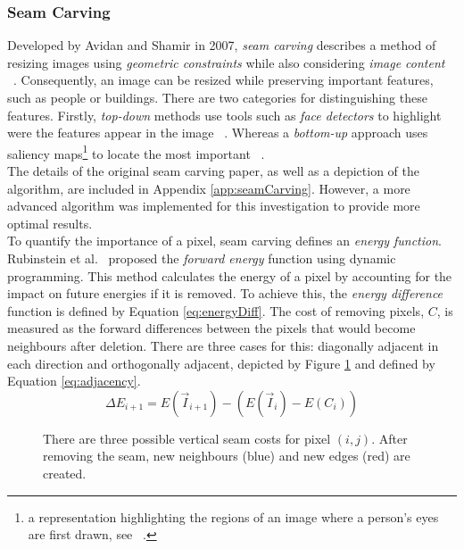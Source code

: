 \subsubsection{Seam Carving}
\label{sec:seamCarving}
\setlength{\leftskip}{0.5cm}
\indent \indent
Developed by Avidan and Shamir in 2007, \textit{seam carving} describes a method of resizing images using \textit{geometric constraints} while also considering \textit{image content} ~\cite{SeamCarving}. Consequently, an image can be resized while preserving important features, such as people or buildings. There are two categories for distinguishing these features. Firstly, \textit{top-down} methods use tools such as \textit{face detectors} to highlight were the features appear in the image ~\cite{Viola}. Whereas a \textit{bottom-up} approach uses saliency maps\footnote{a representation highlighting the regions of an image where a person's eyes are first drawn, see ~\cite{Saliency}.} to locate the most important ~\cite{Itti}.
\smallskip \\ \indent
The details of the original seam carving paper, as well as a depiction of the algorithm, are included in Appendix \ref{app:seamCarving}. However, a more advanced algorithm was implemented for this investigation to provide more optimal results.
\smallskip \\ \indent
To quantify the importance of a pixel, seam carving defines an \textit{energy function}. Rubinstein et al.\ \cite{Rubinstein} proposed the \textit{forward energy} function using dynamic programming. This method calculates the energy of a pixel by accounting for the impact on future energies if it is removed. To achieve this, the \textit{energy difference} function is defined by Equation \ref{eq:energyDiff}. The cost of removing pixels, $C$, is measured as the forward differences between the pixels that would become neighbours after deletion. There are three cases for this: diagonally adjacent in each direction and orthogonally adjacent, depicted by Figure \ref{fig:adjacency} and defined by Equation \ref{eq:adjacency}.
\begin{equation}
    \label{eq:energyDiff}
    \Delta E_{i+1} = E(\vec{I}_{i+1}) - (E(\vec{I}_i) - E(C_i))
\end{equation}
\begin{figure}
    \scalebox{0.78}{}
    \caption[Potential Seam Costs]{There are three possible vertical seam costs for pixel $(i, j)$. After removing the seam, new neighbours (blue) and new edges (red) are created.}
    \label{fig:adjacency}
\end{figure}
